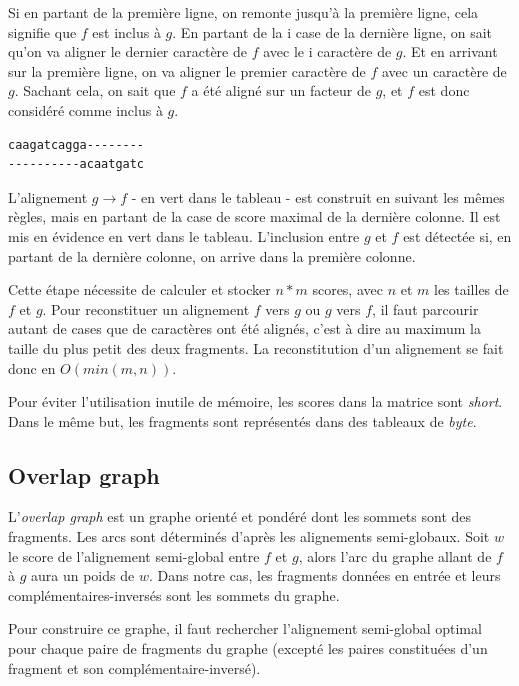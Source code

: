 \documentclass{article}
\begin{document}
Si en partant de la première ligne, on remonte jusqu'à la première ligne, cela signifie que $f$ est inclus à $g$. 
En partant de la i case de la dernière ligne, on sait qu'on va aligner le dernier caractère de $f$ avec le i caractère de $g$. Et en arrivant sur la première ligne, on va aligner le premier caractère de $f$ avec un caractère de $g$. Sachant cela, on sait que $f$ a été aligné sur un facteur de $g$, et $f$ est donc considéré comme inclus à $g$.

\begin{verbatim}
caagatcagga--------
----------acaatgatc
\end{verbatim}

L'alignement $g \to f$ - en vert dans le tableau - est construit en suivant les mêmes règles, mais en partant de la case de score maximal de la dernière colonne. Il est mis en évidence en vert dans le tableau. 
L'inclusion entre $g$ et $f$ est détectée si, en partant de la dernière colonne, on arrive dans la première colonne.


Cette étape nécessite de calculer et stocker $n*m$ scores, avec $n$ et $m$ les tailles de $f$ et $g$.
Pour reconstituer un alignement $f$ vers $g$ ou $g$ vers $f$, il faut parcourir autant de cases que de caractères ont été alignés, c'est à dire au maximum la taille du plus petit des deux fragments. La reconstitution d'un alignement se fait donc en $O(min(m, n))$.

Pour éviter l'utilisation inutile de mémoire, les scores dans la matrice sont \textit{short}. Dans le même but, les fragments sont représentés dans des tableaux de \textit{byte}.
\newpage

\subsection{Overlap graph}

L'\textit{overlap graph} est un graphe orienté et pondéré dont les sommets sont des fragments. Les arcs sont déterminés d'après les alignements semi-globaux. Soit $w$ le score de l'alignement semi-global entre $f$ et $g$, alors l'arc du graphe allant de $f$ à $g$ aura un poids de $w$. Dans notre cas, les fragments données en entrée et leurs complémentaires-inversés sont les sommets du graphe.

Pour construire ce graphe, il faut rechercher l'alignement semi-global optimal pour chaque paire de fragments du graphe (excepté les paires constituées d'un fragment et son complémentaire-inversé).
\end{document}
